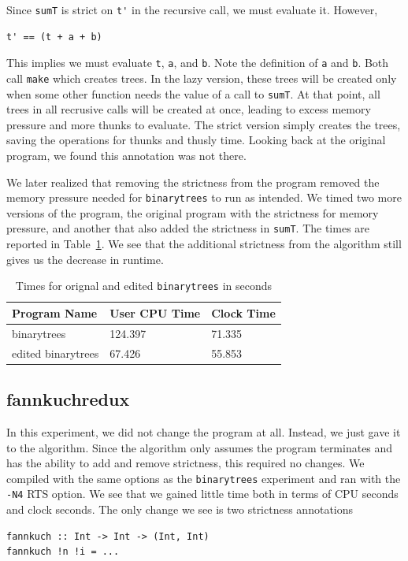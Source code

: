 \documentclass[preprint,nocopyrightspace]{sigplanconf}
\begin{document}
Since \lstinline!sumT! is strict on \lstinline!t'! in the recursive call, we must evaluate it. However,
\begin{lstlisting}
t' == (t + a + b)
\end{lstlisting}
This implies we must evaluate \lstinline!t!, \lstinline!a!, and \lstinline!b!. Note the definition of \lstinline!a! and \lstinline!b!. Both call \lstinline!make! which creates trees. In the lazy version, these trees will be created only when some other function needs the value of a call to \lstinline!sumT!. At that point, all trees in all recrusive calls will be created at once, leading to excess memory pressure and more thunks to evaluate. The strict version simply creates the trees, saving the operations for thunks and thusly time. Looking back at the original program, we found this annotation was not there. 

We later realized that removing the strictness from the program removed the memory pressure needed for \lstinline!binarytrees! to run as intended. We timed two more versions of the program, the original program with the strictness for memory pressure, and another that also added the strictness in \lstinline!sumT!. The times are reported in Table~\ref{tab:btree}. We see that the additional strictness from the algorithm still gives us the decrease in runtime.
\begin{table}[t]
\label{tab:btree}
\begin{tabular}{| l | l | l |}
\hline
Program Name & User CPU Time & Clock Time\\
\hline
binarytrees & 124.397 & 71.335\\
\hline
edited binarytrees & 67.426 & 55.853\\
\hline
\end{tabular}
\caption{Times for orignal and edited \lstinline!binarytrees! in seconds}
\end{table}
\subsection{fannkuchredux}
In this experiment, we did not change the program at all. Instead, we just gave it to the algorithm. Since the algorithm only assumes the program terminates and has the ability to add and remove strictness, this required no changes. We compiled with the same options as the \lstinline!binarytrees! experiment and ran with the \lstinline!-N4! RTS option. We see that we gained little time both in terms of CPU seconds and clock seconds. The only change we see is two strictness annotations
\begin{lstlisting}
fannkuch :: Int -> Int -> (Int, Int)
fannkuch !n !i = ...
\end{lstlisting}
\end{document}
